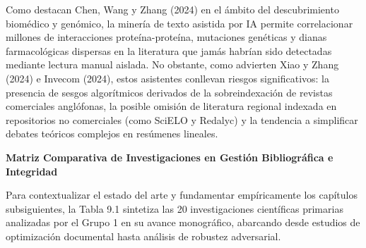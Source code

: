 Como destacan Chen, Wang y Zhang (2024) en el ámbito del descubrimiento biomédico y genómico, la minería de texto asistida por IA permite correlacionar millones de interacciones proteína-proteína, mutaciones genéticas y dianas farmacológicas dispersas en la literatura que jamás habrían sido detectadas mediante lectura manual aislada. No obstante, como advierten Xiao y Zhang (2024) e Invecom (2024), estos asistentes conllevan riesgos significativos: la presencia de sesgos algorítmicos derivados de la sobreindexación de revistas comerciales anglófonas, la posible omisión de literatura regional indexada en repositorios no comerciales (como SciELO y Redalyc) y la tendencia a simplificar debates teóricos complejos en resúmenes lineales.

\vspace{0.4cm}
\textbf{Matriz Comparativa de Investigaciones en Gestión Bibliográfica e Integridad}

Para contextualizar el estado del arte y fundamentar empíricamente los capítulos subsiguientes, la Tabla 9.1 sintetiza las 20 investigaciones científicas primarias analizadas por el Grupo 1 en su avance monográfico, abarcando desde estudios de optimización documental hasta análisis de robustez adversarial.


